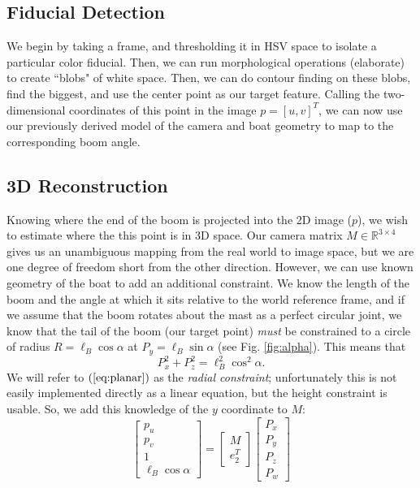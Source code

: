 \documentclass[letterpaper, 10 pt, conference]{ieeeconf}  %
\newcommand{\eq}[1]{$\left(\ref{eq:#1}\right)$}
\newcommand{\real}[1]{\mathbb{R}^{#1}}
\begin{document}
\subsection{Fiducial Detection}
We begin by taking a frame, and thresholding it in HSV space to isolate a particular color fiducial. Then, we can run morphological operations (elaborate) to create ``blobs" of white space. Then, we can do contour finding on these blobs, find the biggest, and use the center point as our target feature. Calling the two-dimensional coordinates of this point in the image $p = [u,v]^T$, we can now use our previously derived model of the camera and boat geometry to map to the corresponding boom angle. 
\subsection{3D Reconstruction}
Knowing where the end of the boom is projected into the 2D image ($p$), we wish to estimate where the this point is in 3D space. Our camera matrix $M \in \real{3 \times 4}$ gives us an unambiguous mapping from the real world to image space, but we are one degree of freedom short from the other direction. However, we can use known geometry of the boat to add an additional constraint. We know the length of the boom and the angle at which it sits relative to the world reference frame, and if we assume that the boom rotates about the mast as a perfect circular joint, we know that the tail of the boom (our target point) \emph{must} be constrained to a circle of radius $R = \ell_B\cos{\alpha}$ at $P_y = \ell_B\sin\alpha$ (see Fig. \ref{fig:alpha}). This means that
\begin{equation}
P_x^2 + P_z^2 = \ell_B^2\cos^2{\alpha}.
\label{eq:planar}
\end{equation}
We will refer to \eq{planar} as the \emph{radial constraint}; unfortunately this is not easily implemented directly as a linear equation, but the height constraint is usable. So, we add this knowledge of the $y$ coordinate to $M$:
\begin{equation}
\left[\begin{array}{c}p_u \\p_v \\1 \\ \ell_B\cos{\alpha} \end{array}\right]
= \left[\begin{array}{c}M \\e_2^T\end{array}\right]
\left[\begin{array}{c}P_x \\P_y \\P_z \\P_w\end{array}\right]
\end{equation}
\end{document}
